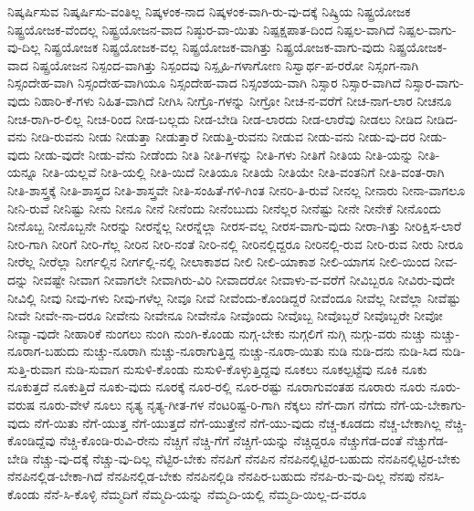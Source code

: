 {ನಿಷ್ಕರ್ಷಿಸುವ
ನಿಷ್ಕರ್ಷಿಸು-ವಂತಿಲ್ಲ
ನಿಷ್ಕಳಂಕ-ನಾದ
ನಿಷ್ಕಳಂಕ-ವಾಗಿ-ರು-ವು-ದಕ್ಕೆ
ನಿಷ್ಕ್ರಿಯ
ನಿಷ್ಟ್ರಯೋಜಕ
ನಿಷ್ಟ್ರಯೋಜಕ-ವೆಂದಲ್ಲ
ನಿಷ್ಟ್ರಯೋಜನ-ವಾದ
ನಿಷ್ಠುರ-ವಾ-ಯಿತು
ನಿಷ್ಪಕ್ಷಪಾತ-ದಿಂದ
ನಿಷ್ಪಲ-ವಾಗಿದೆ
ನಿಷ್ಪಲ-ವಾಗು-ವು-ದಿಲ್ಲ
ನಿಷ್ಪ್ರಯೋಜಕ
ನಿಷ್ಪ್ರಯೋಜಕ-ವಲ್ಲ
ನಿಷ್ಪ್ರಯೋಜಕ-ವಾಗಿತ್ತು
ನಿಷ್ಪ್ರಯೋಜಕ-ವಾಗು-ವುದು
ನಿಷ್ಪ್ರಯೋಜಕ-ವಾದ
ನಿಷ್ಪ್ರಯೋಜನ
ನಿಸ್ಪಂದ-ವಾಗಿತ್ತು
ನಿಸ್ಪಂದವು
ನಿಸ್ಪೃಹಿ-ಗಳಾಗೋಣ
ನಿಸ್ವಾರ್ಥ-ಪ-ರರೋ
ನಿಸ್ಸಂಗ-ನಾಗಿ
ನಿಸ್ಸಂದೇಹ-ವಾಗಿ
ನಿಸ್ಸಂದೇಹ-ವಾಗಿಯೂ
ನಿಸ್ಸಂದೇಹ-ವಾದ
ನಿಸ್ಸಂಶಯ-ವಾಗಿ
ನಿಸ್ಸಾರ
ನಿಸ್ಸಾರ-ವಾಗಿದೆ
ನಿಸ್ಸಾರ-ವಾಗು-ವುದು
ನಿಹಾರಿ-ಕೆ-ಗಳು
ನಿಹಿತ-ವಾಗಿದೆ
ನೀಗಿಸಿ
ನೀಗ್ರೊ-ಗಳನ್ನು
ನೀಗ್ರೋ
ನೀಚ-ನ-ವರೆಗೆ
ನೀಚ-ನಾಗ-ಲಾರ
ನೀಚನೂ
ನೀಚ-ರಾಗಿ-ರ-ಲಿಲ್ಲ
ನೀಚ-ರಿಂದ
ನೀಡ-ಬಲ್ಲದು
ನೀಡ-ಬೇಡಿ
ನೀಡ-ಲಾರದು
ನೀಡ-ಲಾರೆವು
ನೀಡಲು
ನೀಡಿದ
ನೀಡಿದ-ವನು
ನೀಡಿ-ರುವನು
ನೀಡು
ನೀಡುತ್ತಾ
ನೀಡುತ್ತಾರೆ
ನೀಡುತ್ತಿ-ರುವನು
ನೀಡುವ
ನೀಡು-ವನು
ನೀಡು-ವು-ದರ
ನೀಡು-ವುದು
ನೀಡು-ವುದೇ
ನೀಡು-ವೆನು
ನೀಡೆಂದು
ನೀತಿ
ನೀತಿ-ಗಳನ್ನು
ನೀತಿ-ಗಳು
ನೀತಿಗೆ
ನೀತಿಯ
ನೀತಿ-ಯನ್ನು
ನೀತಿ-ಯನ್ನೂ
ನೀತಿ-ಯಲ್ಲವೆ
ನೀತಿ-ಯಲ್ಲಿ
ನೀತಿ-ಯಿದೆ
ನೀತಿಯೂ
ನೀತಿಯೆ
ನೀತಿಯೇ
ನೀತಿ-ವಂತನಿಗೆ
ನೀತಿ-ವಂತ-ರಾಗಿ
ನೀತಿ-ಶಾಸ್ತ್ರಕ್ಕೆ
ನೀತಿ-ಶಾಸ್ತ್ರದ
ನೀತಿ-ಶಾಸ್ತ್ರವೇ
ನೀತಿ-ಸಂಹಿತೆ-ಗಳಿ-ಗಿಂತ
ನೀನರಿ-ತಿ-ರುವೆ
ನೀನಲ್ಲ
ನೀನಾರು
ನೀನಾ-ವಾಗಲೂ
ನೀನಿ-ರುವೆ
ನೀನಿಷ್ಟು
ನೀನು
ನೀನೂ
ನೀನೆ
ನೀನೆಂದು
ನೀನೆಂಬುದು
ನೀನೆಲ್ಲರ
ನೀನೆಷ್ಟು
ನೀನೇ
ನೀನೇಕೆ
ನೀನೊಂದು
ನೀನೊಬ್ಬ
ನೀನೊಬ್ಬನೇ
ನೀರನ್ನು
ನೀರನ್ನೆಲ್ಲ
ನೀರನ್ನೆಲ್ಲಾ
ನೀರಸ-ವಲ್ಲ
ನೀರಸ-ವಾಗು-ವುದು
ನೀರಾ-ಗಿತ್ತು
ನೀರಿಕ್ಷಿಸ-ಲಾರೆ
ನೀರಿ-ಗಾಗಿ
ನೀರಿಗೆ
ನೀರಿ-ಗೆಲ್ಲ
ನೀರಿನ
ನೀರಿ-ನಂತೆ
ನೀರಿ-ನಲ್ಲಿ
ನೀರಿನಲ್ಲಿದ್ದರೂ
ನೀರಿನಲ್ಲಿ-ರುವ
ನೀರಿ-ರುವ
ನೀರು
ನೀರೂ
ನೀರೆಲ್ಲ
ನೀರೆಲ್ಲಾ
ನೀರ್ಗಲ್ಲಿನ
ನೀರ್ಗಲ್ಲಿ-ನಲ್ಲಿ
ನೀಲಾಕಾಶದ
ನೀಲಿ
ನೀಲಿ-ಯಾಕಾಶ
ನೀಲಿ-ಯಾಗಸ
ನೀಲಿ-ಯಿಂದ
ನೀವ-ದನ್ನು
ನೀವಷ್ಟೇ
ನೀವಾಗ
ನೀವಾಗಲೇ
ನೀವಾಗಿರು-ವಿರಿ
ನೀವಾದರೋ
ನೀವಾಳು-ವ-ವರೆಗೆ
ನೀವಿಬ್ಬರೂ
ನೀವಿರು-ವುದೇ
ನೀವಿಲ್ಲಿ
ನೀವು
ನೀವು-ಗಳು
ನೀವು-ಗಳೆಲ್ಲ
ನೀವೂ
ನೀವೆ
ನೀವೆಂದು-ಕೊಂಡಿದ್ದರೆ
ನೀವೆಂದೂ
ನೀವೆಲ್ಲ
ನೀವೆಲ್ಲಾ
ನೀವೆಷ್ಟು
ನೀವೇ
ನೀವೇ-ನಾ-ದರೂ
ನೀವೇನು
ನೀವೇನೂ
ನೀವೇನೊ
ನೀವೊಂದು
ನೀವೊಬ್ಬ
ನೀವೊಬ್ಬರೆ
ನೀವೊಬ್ಬರೇ
ನೀವೋ
ನೀವ್ಯಾ-ವುದೇ
ನೀಹಾರಿಕೆ
ನುಂಗಲು
ನುಂಗಿ
ನುಂಗಿ-ಕೊಂಡು
ನುಗ್ಗ-ಬೇಕು
ನುಗ್ಗಲಿಗೆ
ನುಗ್ಗಿ
ನುಗ್ಗು-ವರು
ನುಚ್ಚು
ನುಚ್ಚು-ನೂರಾಗ-ಬಹುದು
ನುಚ್ಚು-ನೂರಾಗಿ
ನುಚ್ಚು-ನೂರಾಗುತ್ತಿದ್ದ
ನುಚ್ಚು-ನೂರಾ-ಯಿತು
ನುಡಿ
ನುಡಿ-ದನು
ನುಡಿ-ಸಿದ
ನುಡಿ-ಸುತ್ತಿ-ರುವಾಗ
ನುಡಿ-ಸುವಾಗ
ನುಸುಳಿ-ಕೊಂಡು
ನುಸುಳಿ-ಕೊಳ್ಳುತ್ತಿದ್ದವು
ನೂಕಲು
ನೂಕಲ್ಪಟ್ಟೆವು
ನೂಕಿ
ನೂಕು
ನೂಕುತ್ತದೆ
ನೂಕುತ್ತಿದೆ
ನೂಕು-ವುದು
ನೂರಕ್ಕೆ
ನೂರ-ರಲ್ಲಿ
ನೂರ-ರಷ್ಟು
ನೂರಾಗುವಂತಹ
ನೂರಾರು
ನೂರು
ನೂರು-ವರುಷ
ನೂರು-ವೇಳೆ
ನೂಲು
ನೃತ್ಯ
ನೃತ್ಯ-ಗೀತ-ಗಳ
ನೆಂಟರಿಷ್ಟ-ರಿ-ಗಾಗಿ
ನೆಕ್ಕಲು
ನೆಗೆ-ದಾಗ
ನೆಗೆದು
ನೆಗೆ-ಯ-ಬೇಕಾಗು-ವುದು
ನೆಗೆ-ಯಿತು
ನೆಗೆ-ಯುತ್ತ
ನೆಗೆ-ಯುತ್ತದೆ
ನೆಗೆ-ಯುತ್ತೇನೆ
ನೆಗೆ-ಯು-ವುದು
ನೆಚ್ಚ-ಕೂಡದು
ನೆಚ್ಚ-ಬೇಕಾಗಿಲ್ಲ
ನೆಚ್ಚಿ-ಕೊಂಡಿದ್ದೆವು
ನೆಚ್ಚಿ-ಕೊಂಡಿ-ರುವಿ-ರೇನು
ನೆಚ್ಚಿಗೆ
ನೆಚ್ಚಿ-ಗೆಗೆ
ನೆಚ್ಚಿಗೆ-ಯನ್ನು
ನೆಚ್ಚಿದ್ದರೂ
ನೆಚ್ಚುಗೆಡ-ದಂತೆ
ನೆಚ್ಚುಗೆಡ-ಬೇಡಿ
ನೆಚ್ಚು-ವು-ದಕ್ಕೆ
ನೆಚ್ಚು-ವು-ದಿಲ್ಲ
ನೆಟ್ಟಿರ-ಬೇಕು
ನೆನಪಿಗೆ
ನೆನಪಿನ
ನೆನಪಿನಲ್ಲಿಟ್ಟಿರ-ಬಹುದು
ನೆನಪಿನಲ್ಲಿಟ್ಟಿರ-ಬೇಕು
ನೆನಪಿನಲ್ಲಿಡ-ಬೇಕಾ-ಗಿದೆ
ನೆನಪಿನಲ್ಲಿಡ-ಬೇಕು
ನೆನಪಿನಲ್ಲಿಡಿ
ನೆನಪಿರ-ಬಹುದು
ನೆನಪಿ-ರು-ವು-ದಿಲ್ಲ
ನೆನಪು
ನೆನಸಿ-ಕೊಂಡು
ನೆನೆ-ಸಿ-ಕೊಳ್ಳಿ
ನೆಮ್ಮದಿಗೆ
ನೆಮ್ಮದಿ-ಯನ್ನು
ನೆಮ್ಮದಿ-ಯಲ್ಲಿ
ನೆಮ್ಮದಿ-ಯಿಲ್ಲ-ದ-ವರೂ
}
